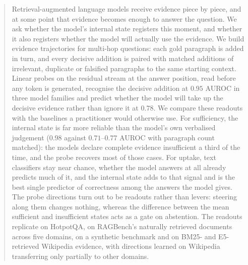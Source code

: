 \begin{abstract}
Retrieval-augmented language models receive evidence piece by piece, and at some point that evidence becomes enough to answer the question. We ask whether the model's internal state registers this moment, and whether it also registers whether the model will actually use the evidence. We build evidence trajectories for multi-hop questions: each gold paragraph is added in turn, and every decisive addition is paired with matched additions of irrelevant, duplicate or falsified paragraphs to the same starting context. Linear probes on the residual stream at the answer position, read before any token is generated, recognise the decisive addition at $0.95$ AUROC in three model families and predict whether the model will take up the decisive evidence rather than ignore it at $0.78$. We compare these readouts with the baselines a practitioner would otherwise use. For sufficiency, the internal state is far more reliable than the model's own verbalised judgement ($0.98$ against $0.71$--$0.77$ AUROC with paragraph count matched): the models declare complete evidence insufficient a third of the time, and the probe recovers most of those cases. For uptake, text classifiers stay near chance, whether the model answers at all already predicts much of it, and the internal state adds to that signal and is the best single predictor of correctness among the answers the model gives. The probe directions turn out to be readouts rather than levers: steering along them changes nothing, whereas the difference between the mean sufficient and insufficient states acts as a gate on abstention. The readouts replicate on HotpotQA, on RAGBench's naturally retrieved documents across five domains, on a synthetic benchmark and on BM25- and E5-retrieved Wikipedia evidence, with directions learned on Wikipedia transferring only partially to other domains.
\end{abstract}
